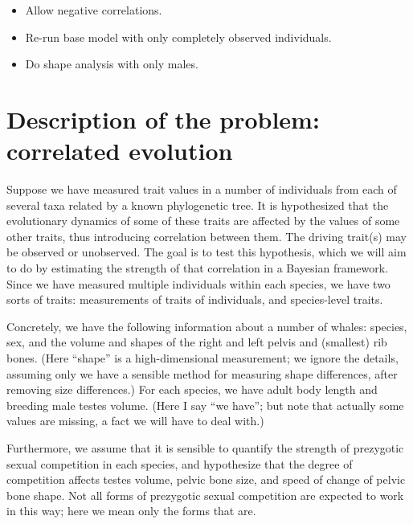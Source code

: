 \documentclass{article}
\begin{document}
\begin{itemize}

  \item Allow negative correlations.

  \item Re-run base model with only completely observed individuals.

  \item Do shape analysis with only males.

\end{itemize}

\section{Description of the problem: correlated evolution}

Suppose we have measured trait values in a number of individuals from each of several taxa related by a known phylogenetic tree.
It is hypothesized that the evolutionary dynamics of some of these traits
are affected by the values of some other traits,
thus introducing correlation between them.
The driving trait(s) may be observed or unobserved.
The goal is to test this hypothesis,
which we will aim to do by estimating the strength of that correlation
in a Bayesian framework.
Since we have measured multiple individuals within each species,
we have two sorts of traits:
measurements of traits of individuals, 
and species-level traits.

Concretely, we have the following information about a number of whales:
species, sex,
and the volume and shapes of the right and left pelvis and (smallest) rib bones.
(Here ``shape'' is a high-dimensional measurement;
we ignore the details, assuming only we have a sensible method for measuring shape differences,
after removing size differences.)
For each species, we have
adult body length and
breeding male testes volume.
(Here I say ``we have''; but note that actually some values are missing,
a fact we will have to deal with.)

Furthermore, we assume that it is sensible to quantify the strength of prezygotic sexual competition in each species,
and hypothesize that the degree of competition affects testes volume, pelvic bone size, and speed of change of pelvic bone shape.
Not all forms of prezygotic sexual competition are expected to work in this way;
here we mean only the forms that are.
\end{document}
